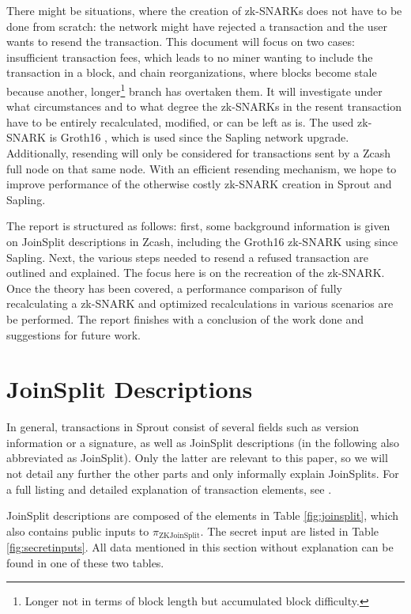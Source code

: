 \documentclass{article}
\begin{document}
There might be situations, where the creation of zk-SNARKs does not have to be done from scratch: the network might have rejected a transaction and the user wants to resend the transaction.
This document will focus on two cases: insufficient transaction fees, which leads to no miner wanting to include the transaction in a block, and chain reorganizations, where blocks become stale because another, longer\footnote{Longer not in terms of block length but accumulated block difficulty.} branch has overtaken them.
It will investigate under what circumstances and to what degree the zk-SNARKs in the resent transaction have to be entirely recalculated, modified, or can be left as is.
The used zk-SNARK is Groth16 \cite{groth:zksnark}, which is used since the Sapling network upgrade.
Additionally, resending will only be considered for transactions sent by a Zcash full node on that same node.
With an efficient resending mechanism, we hope to improve performance of the otherwise costly zk-SNARK creation in Sprout and Sapling.

The report is structured as follows: first, some background information is given on JoinSplit descriptions in Zcash, including the Groth16 zk-SNARK using since Sapling.
Next, the various steps needed to resend a refused transaction are outlined and explained.
The focus here is on the recreation of the zk-SNARK.
Once the theory has been covered, a performance comparison of fully recalculating a zk-SNARK and optimized recalculations in various scenarios are be performed.
The report finishes with a conclusion of the work done and suggestions for future work.

\section{JoinSplit Descriptions} \label{sec:joinsplit}

In general, transactions in Sprout consist of several fields such as version information or a signature, as well as JoinSplit descriptions (in the following also abbreviated as JoinSplit).
Only the latter are relevant to this paper, so we will not detail any further the other parts and only informally explain JoinSplits.
For a full listing and detailed explanation of transaction elements, see \cite{hopwood:zcash}.

JoinSplit descriptions are composed of the elements in Table \ref{fig:joinsplit}, which also contains public inputs to $\pi_\text{ZKJoinSplit}$.
The secret input are listed in Table \ref{fig:secretinputs}.
All data mentioned in this section without explanation can be found in one of these two tables.
\end{document}
